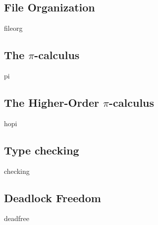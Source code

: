 \subsection{File Organization}
{fileorg}

\subsection{The \texorpdfstring{$\pi$}{pi}-calculus}
{pi}

\subsection{The Higher-Order \texorpdfstring{$\pi$}{pi}-calculus}
{hopi}

\subsection{Type checking}
{checking}

\subsection{Deadlock Freedom}
{deadfree}